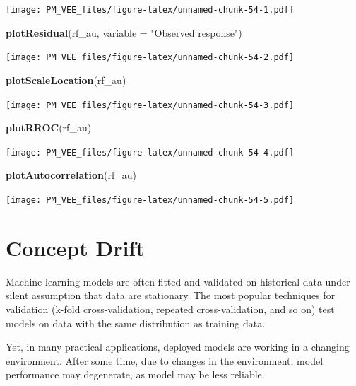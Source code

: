 \documentclass[]{krantz}
\newenvironment{Shaded}{\begin{snugshade}}{\end{snugshade}}
\newcommand{\DataTypeTok}[1]{\textcolor[rgb]{0.13,0.29,0.53}{#1}}
\newcommand{\KeywordTok}[1]{\textcolor[rgb]{0.13,0.29,0.53}{\textbf{#1}}}
\newcommand{\NormalTok}[1]{#1}
\newcommand{\StringTok}[1]{\textcolor[rgb]{0.31,0.60,0.02}{#1}}
\theoremstyle{definition}
\theoremstyle{definition}
\theoremstyle{definition}
\theoremstyle{remark}
\begin{document}
\texttt{[image: PM\_VEE\_files/figure-latex/unnamed-chunk-54-1.pdf]}

\begin{Shaded}
\begin{Highlighting}[]
\KeywordTok{plotResidual}\NormalTok{(rf_au, }\DataTypeTok{variable =} \StringTok{"Observed response"}\NormalTok{)}
\end{Highlighting}
\end{Shaded}

\texttt{[image: PM\_VEE\_files/figure-latex/unnamed-chunk-54-2.pdf]}

\begin{Shaded}
\begin{Highlighting}[]
\KeywordTok{plotScaleLocation}\NormalTok{(rf_au)}
\end{Highlighting}
\end{Shaded}

\texttt{[image: PM\_VEE\_files/figure-latex/unnamed-chunk-54-3.pdf]}

\begin{Shaded}
\begin{Highlighting}[]
\KeywordTok{plotRROC}\NormalTok{(rf_au)}
\end{Highlighting}
\end{Shaded}

\texttt{[image: PM\_VEE\_files/figure-latex/unnamed-chunk-54-4.pdf]}

\begin{Shaded}
\begin{Highlighting}[]
\KeywordTok{plotAutocorrelation}\NormalTok{(rf_au)}
\end{Highlighting}
\end{Shaded}

\texttt{[image: PM\_VEE\_files/figure-latex/unnamed-chunk-54-5.pdf]}

\hypertarget{concept-drift}{%
\section{Concept Drift}\label{concept-drift}}

Machine learning models are often fitted and validated on historical
data under silent assumption that data are stationary. The most popular
techniques for validation (k-fold cross-validation, repeated
cross-validation, and so on) test models on data with the same
distribution as training data.

Yet, in many practical applications, deployed models are working in a
changing environment. After some time, due to changes in the
environment, model performance may degenerate, as model may be less
reliable.
\end{document}
